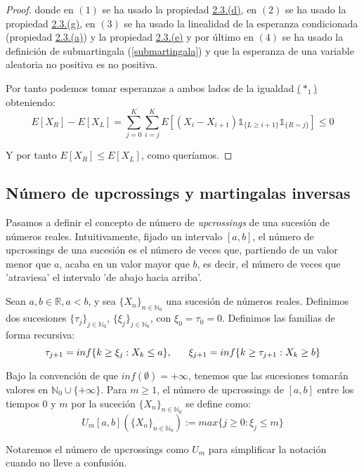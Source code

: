 \begin{proof}
donde en $(1)$ se ha usado la propiedad \hyperref[PropE6]{2.3.(d)}, en $(2)$ se ha usado la propiedad \hyperref[PropS2]{2.3.(g)}, en $(3)$ se ha usado la linealidad de la esperanza condicionada (propiedad \hyperref[PropE2]{2.3.(a)}) y la propiedad \hyperref[PropS1]{2.3.(e)} y por último en $(4)$ se ha usado la definición de submartingala (\ref{submartingala}) y que la esperanza de una variable aleatoria no positiva es no positiva.

Por tanto podemos tomar esperanzas a ambos lados de la igualdad \hyperref[aux]{($*_1$)} obteniendo:
$$E[X_R]-E[X_L] = \sum_{j=0}^{K} \sum_{i=j}^{K} E[(X_i - X_{i+1}) \mathds{1}_{\{L\geq i+1\}} \mathds{1}_{\{R=j\}}] \leq 0 $$

Y por tanto $E[X_R]\leq E[X_L]$, como queríamos.

\end{proof}

\subsection{Número de upcrossings y martingalas inversas}
Pasamos a definir el concepto de número de \emph{upcrossings} de una sucesión de números reales. Intuitivamente, fijado un intervalo $[a,b]$, el número de upcrossings de una sucesión es el número de veces que, partiendo de un valor menor que $a$, acaba en un valor mayor que $b$, es decir, el número de veces que 'atraviesa' el intervalo 'de abajo hacia arriba'.

\begin{definicion}
Sean $a,b\in\mathds{R}, a<b$, y sea $\{X_n\}_{n\in\mathds{N}_0}$ una sucesión de números reales. Definimos dos sucesiones $\{\tau _j\}_{j\in \mathds{N}_0}$, $\{\xi _j\}_{j\in \mathds{N}_0}$, con $\xi _0 = \tau _0 =0$. Definimos las familias de forma recursiva:
$$ \tau_{j+1} = inf\{k\geq \xi_j : X_k\leq a\}, \hspace{0.6cm} \xi_{j+1} = inf\{k\geq \tau_{j+1} : X_k\geq b\}$$

Bajo la convención de que $inf(\emptyset)=+\infty$, tenemos que las sucesiones tomarán valores en $\mathds{N}_0\cup \{+\infty\}$. Para $m\geq 1$, el número de upcrossings de $[a,b]$ entre los tiempos $0$ y $m$ por la suceción $\{X_n\}_{n\in\mathds{N}_0}$ se define como:
$$ U_m[a,b](\{X_n\}_{n\in\mathds{N}_0}) := max\{j\geq 0 : \xi_j \leq m\} $$

Notaremos el número de upcrossings como $U_m$ para simplificar la notación cuando no lleve a confusión.
\end{definicion}

